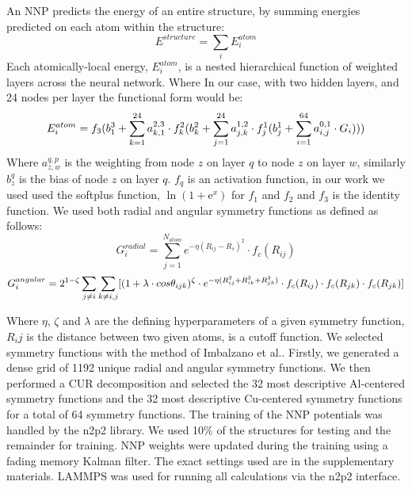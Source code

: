 \documentclass{article}
\begin{document}
An NNP predicts the energy of an entire structure, by summing energies predicted on each atom within the structure: 
\begin{equation}
E^{structure} = \sum_i E^{atom}_i
\end{equation}
Each atomically-local energy, $E^{atom}_i$, is a nested hierarchical function of weighted layers across the neural network.
Where In our case, with two hidden layers, and 24 nodes per layer the functional form would be:
\begin{equation}
E^{atom}_i = f_3 \Large( b^3_1+\sum^{24}_{k=1}a^{2,3}_{k,1}\cdot f^2_k\Large(b^2_k+\sum^{24}_{j=1}a^{1,2}_{j,k}\cdot f^1_j \Large( b^1_j + \sum^{64}_{i=1} a^{0,1}_{i,j}\cdot G_i                 \Large)\Large)\Large) 
\end{equation}
Where $a^{q,p}_{z,w}$ is the weighting from node $z$ on layer $q$ to node $z$ on layer $w$, similarly $b^q_z$ is
the bias of node $z$ on layer $q$. $f_q$ is an activation function, in our work we used used the softplus function,
$\ln (1 + \mathrm{e}^x)$ for $f_1$ and $f_2$ and $f_3$ is the identity function. 
We used both radial and angular symmetry functions as  defined as follows:
\begin{equation}
G^{radial}_i = \sum^{N_{atom}}_{j=1}e^{-\eta(R_{ij}-R_{s})^2}\cdot f_c(R_{ij})
\end{equation}
\begin{equation}
G^{angular}_i = 2^{1-\zeta}\sum_{j\neq i}\sum_{k\neq i,j}\large[ (1+\lambda\cdot cos\theta_{ijk})^\zeta \cdot e^{-\eta(R^2_{ij}+R^2_{ik}+R^2_{jk})}\cdot f_c(R_{ij}) \cdot f_c(R_{jk}) \cdot f_c(R_{jk}) \large]
\end{equation}

Where $\eta$, $\zeta$ and $\lambda$ are the defining hyperparameters of a given symmetry function, $R_ij$ is 
the distance between two given atoms, is a cutoff function. 
We selected symmetry functions with the method of Imbalzano et al.\cite{Imbalzano2018}.
Firstly, we generated a dense grid of 1192 unique radial and angular symmetry functions.
We then performed a CUR decomposition and selected the 32 most descriptive Al-centered symmetry functions and the 32 most descriptive Cu-centered symmetry functions for a total of 64 symmetry functions.
The training of the NNP potentials was handled by the n2p2 library\cite{Singraber2019ParallelPotentials}\cite{Singraber2019Library-BasedPotentials}.
We used 10\% of the structures for testing and the remainder for training.
NNP weights were updated during the training using a fading memory Kalman filter.
The exact settings used are in the supplementary materials.
LAMMPS\cite{Plimpton1995} was used for running all calculations via the n2p2 interface. 
\end{document}
